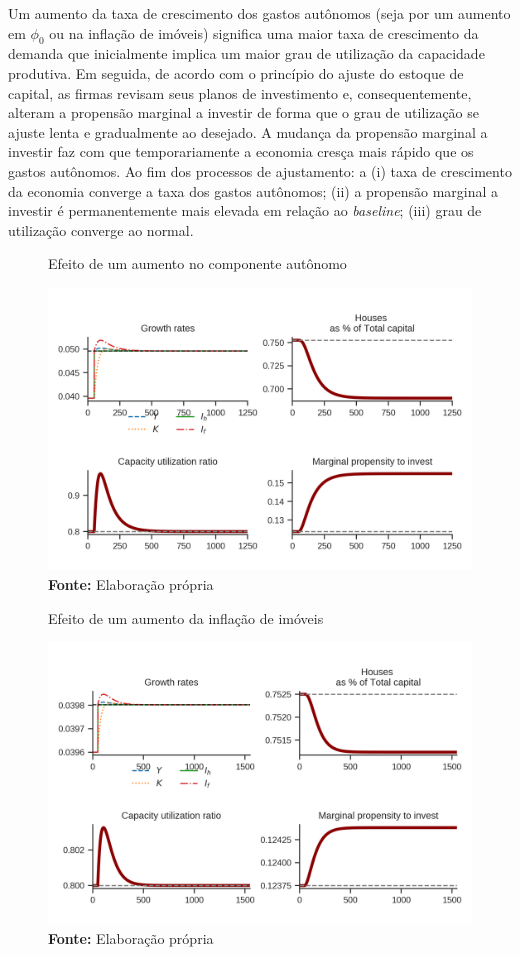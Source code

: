 Um aumento da taxa de crescimento dos gastos autônomos (seja por um aumento em $\phi_0$ ou na inflação de imóveis) significa uma maior taxa de crescimento da demanda que inicialmente implica um maior grau de utilização da capacidade produtiva. Em seguida, de acordo com o princípio do ajuste do estoque de capital, as firmas revisam seus planos de investimento e, consequentemente, alteram a propensão marginal a investir de forma que o grau de utilização se ajuste lenta e gradualmente ao desejado. A mudança da propensão marginal a investir faz com que temporariamente a economia cresça mais rápido que os gastos autônomos. Ao fim dos processos de ajustamento: a (i) taxa de crescimento da economia converge a taxa dos gastos autônomos; (ii) a propensão marginal a investir é permanentemente mais elevada em relação ao \textit{baseline}; (iii) grau de utilização converge ao normal.



\begin{figure}[htb]
	\centering
	\caption{Efeito de um aumento no componente autônomo}
	\label{choque_1}
	\includegraphics{../../Modelo/Versoes/Shock_1.png}
	\caption*{\textbf{Fonte:} Elaboração própria}
\end{figure}


\begin{figure}[htb]
	\centering
	\caption{Efeito de um aumento da inflação de imóveis}
	\label{choque_4}
	\includegraphics{../../Modelo/Versoes/Shock_4.png}
	\caption*{\textbf{Fonte:} Elaboração própria}
\end{figure}

